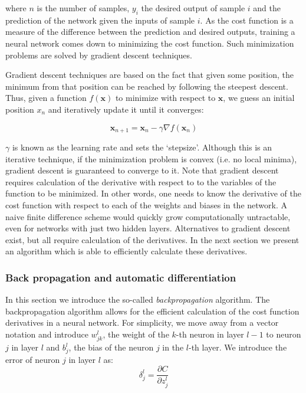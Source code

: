 \documentclass{Dissertate}
\begin{document}
where \(n\) is the number of samples, \(y_i\) the desired output of
sample \(i\) and the prediction of the network given the inputs of
sample \(i\). As the cost function is a measure of the difference
between the prediction and desired outputs, training a neural network
comes down to minimizing the cost function. Such minimization problems
are solved by gradient descent techniques.

Gradient descent techniques are based on the fact that given some
position, the minimum from that position can be reached by
following the steepest descent. Thus, given a function \(f(\mathbf{x})\)
to minimize with respect to \(\mathbf{x}\), we guess an initial position
\(x_n\) and iteratively update it until it converges:

\begin{equation}
\mathbf{x}_{n+1} = \mathbf{x}_{n}-\gamma\nabla f(\mathbf{x}_n)
\label{eq:gradientdescent}\end{equation}

\(\gamma\) is known as the learning rate and sets the `stepsize'.
Although this is an iterative technique, if the minimization problem is
convex (i.e. no local minima), gradient descent is guaranteed to
converge to it. Note that gradient descent requires calculation of the
derivative with respect to to the variables of the function to be minimized. In other words, one needs to know the derivative of the cost function with respect to each of the weights and biases in the network. A naive finite difference
scheme would quickly grow computationally untractable, even for networks
with just two hidden layers. Alternatives to gradient descent exist, but
all require calculation of the derivatives. In the next section we
present an algorithm which is able to efficiently calculate these
derivatives.

\hypertarget{back-propagation-and-automatic-differentiation}{%
\subsubsection*{Back propagation and automatic
differentiation}\label{back-propagation-and-automatic-differentiation}}

In this section we introduce the so-called \emph{backpropagation}
algorithm. The backpropagation algorithm allows for the efficient
calculation of the cost function derivatives in a neural network. For
simplicity, we move away from a vector notation and introduce
\(w^l_{jk}\), the weight of the \(k\)-th neuron in layer \(l-1\) to
neuron \(j\) in layer \(l\) and \(b^l_j\), the bias of the neuron \(j\)
in the \(l\)-th layer. We introduce the error of neuron \(j\) in layer
\(l\) as: \[
\delta^l_j=\frac{\partial C}{\partial z^l_j}
\]
\end{document}
